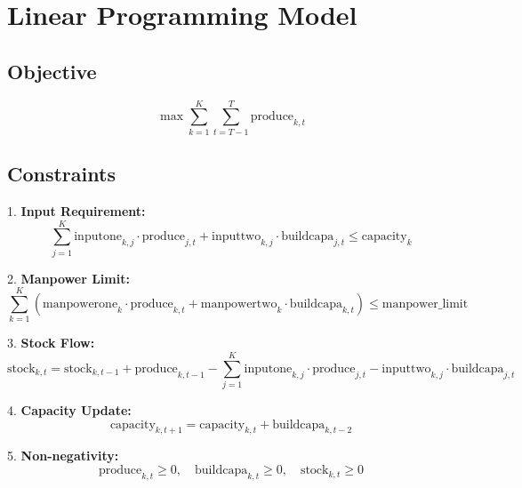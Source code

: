 \documentclass{article}
\begin{document}
\section*{Linear Programming Model}

\subsection*{Objective}
\[
\max \sum_{k=1}^{K} \sum_{t=T-1}^{T} \text{produce}_{k,t}
\]

\subsection*{Constraints}

1. \textbf{Input Requirement:}
\[
\sum_{j=1}^{K} \text{inputone}_{k,j} \cdot \text{produce}_{j,t} + \text{inputtwo}_{k,j} \cdot \text{buildcapa}_{j,t} \leq \text{capacity}_{k}
\]

2. \textbf{Manpower Limit:}
\[
\sum_{k=1}^{K} (\text{manpowerone}_k \cdot \text{produce}_{k,t} + \text{manpowertwo}_k \cdot \text{buildcapa}_{k,t}) \leq \text{manpower\_limit}
\]

3. \textbf{Stock Flow:}
\[
\text{stock}_{k,t} = \text{stock}_{k,t-1} + \text{produce}_{k,t-1} - \sum_{j=1}^{K} \text{inputone}_{k,j} \cdot \text{produce}_{j,t} - \text{inputtwo}_{k,j} \cdot \text{buildcapa}_{j,t}
\]

4. \textbf{Capacity Update:}
\[
\text{capacity}_{k,t+1} = \text{capacity}_{k,t} + \text{buildcapa}_{k,t-2}
\]

5. \textbf{Non-negativity:}
\[
\text{produce}_{k,t} \geq 0, \quad \text{buildcapa}_{k,t} \geq 0, \quad \text{stock}_{k,t} \geq 0
\]
\end{document}
